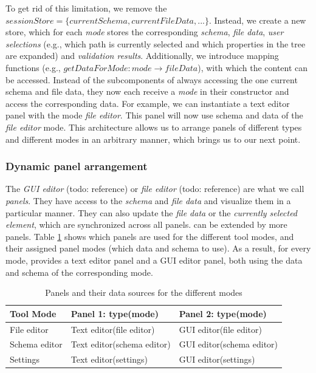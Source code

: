 To get rid of this limitation, we remove the $sessionStore = \{currentSchema, currentFileData, ...\}$.
Instead, we create a new store, which for each \textit{mode} stores the corresponding \textit{schema}, \textit{file data}, \textit{user selections} (e.g., which path is currently selected and which properties in the tree are expanded) and \textit{validation results}.
Additionally, we introduce mapping functions (e.g., $getDataForMode: mode \rightarrow {fileData}$), with which the content can be accessed.
Instead of the subcomponents of \toolname{} always accessing the one current schema and file data, they now each receive a \textit{mode} in their constructor and access the corresponding data.
For example, we can instantiate a text editor panel with the mode \textit{file editor}.
This panel will now use schema and data of the \textit{file editor} mode.
This architecture allows us to arrange panels of different types and different modes in an arbitrary manner, which brings us to our next point.



\subsubsection{Dynamic panel arrangement}
The \textit{GUI editor} (todo: reference) or \textit{file editor} (todo: reference) are what we call \textit{panels}.
They have access to the \textit{schema} and \textit{file data} and visualize them in a particular manner.
They can also update the \textit{file data} or the \textit{currently selected element}, which are synchronized across all panels.
\toolname{} can be extended by more panels.
Table \ref{tab:panels_by_mode} shows which panels are used for the different tool modes, and their assigned panel modes (which data and schema to use).
As a result, for every mode, \toolname{} provides a text editor panel and a GUI editor panel, both using the data and schema of the corresponding mode.

\begin{table}[!t]
\caption{Panels and their data sources for the different modes}
\label{tab:panels_by_mode}
\centering\scriptsize
\begin{tabular}{@{}lll@{}}
\toprule
\textbf{Tool Mode} & \textbf{Panel 1: type(mode)} & \textbf{Panel 2: type(mode)} \\ \midrule
File editor        & Text editor(file editor)     & GUI editor(file editor)      \\
Schema editor      & Text editor(schema editor)   & GUI editor(schema editor)    \\
Settings           & Text editor(settings)        & GUI editor(settings)         \\ \bottomrule
\end{tabular}
\end{table}

